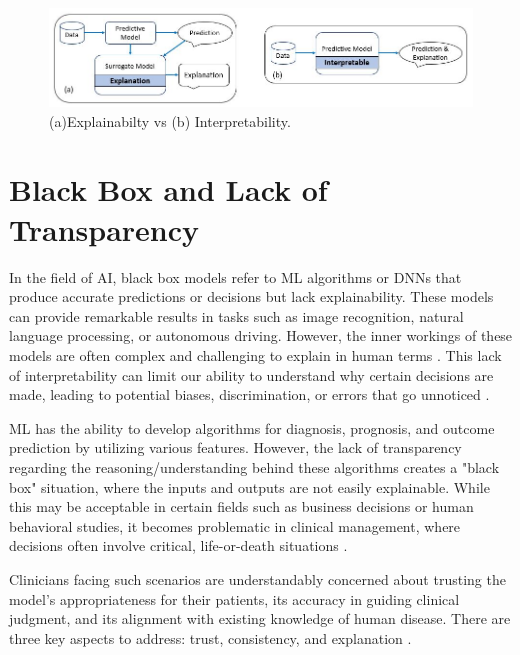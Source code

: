 \documentclass{article}
\begin{document}
\begin{figure}
\centering
\includegraphics[width=1\linewidth]{Fig1.2.jpg}
\caption{\label{fig:1.2} (a)Explainabilty vs (b) Interpretability.}
\end{figure}

\section{Black Box and Lack of Transparency}
In the field of AI, black box models refer to ML algorithms or DNNs that produce accurate predictions or decisions but lack explainability. These models can provide remarkable results in tasks such as image recognition, natural language processing, or autonomous driving. However, the inner workings of these models are often complex and challenging to explain in human terms \cite{bathaee2017artificial, makhni2021artificial}. This lack of interpretability can limit our ability to understand why certain decisions are made, leading to potential biases, discrimination, or errors that go unnoticed \cite{ribeiro2016should}.

ML has the ability to develop algorithms for diagnosis, prognosis, and outcome prediction by utilizing various features. However, the lack of transparency regarding the reasoning/understanding behind these algorithms creates a "black box" situation, where the inputs and outputs are not easily explainable. While this may be acceptable in certain fields such as business decisions or human behavioral studies, it becomes problematic in clinical management, where decisions often involve critical, life-or-death situations \cite{ghassemi2020review}.

Clinicians facing such scenarios are understandably concerned about trusting the model's appropriateness for their patients, its accuracy in guiding clinical judgment, and its alignment with existing knowledge of human disease. There are three key aspects to address: trust, consistency, and explanation \cite{zihni2020opening}.
\end{document}
